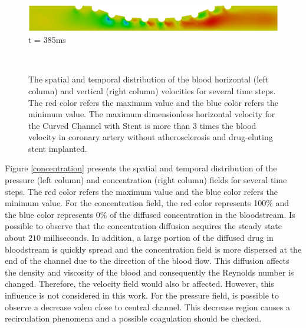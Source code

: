 \documentclass[10pt,fleqn,a4paper,twoside]{article}
\begin{document}
\begin{figure}[H]
\begin{minipage}{.45\linewidth}
      \includegraphics[scale=0.17]{./figure/verticalVelocity3.png}\\
      t = 385ms
     \end{minipage}\\[0.3cm]
     \caption{
The spatial and temporal distribution 
of the blood horizontal (left
column) and vertical (right column) velocities for
several time steps. 
The red color refers the maximum value and 
the blue color refers the minimum value.
The maximum dimensionless horizontal
velocity for the Curved Channel with Stent is 
more than 3 times the blood velocity in coronary 
artery without atherosclerosis and
drug-eluting stent implanted.
}\label{velocity}
\end{figure}







\smallskip
Figure \ref{concentration} presents the spatial and 
temporal distribution of the pressure (left
column) and concentration (right column) fields for
several time steps. The red color refers the maximum value and 
the blue color refers the minimum value.
For the concentration field, 
the red color represents 100\% and 
the blue color represents 0\% of the diffused concentration
in the bloodstream. Is possible to observe that
the concentration diffusion acquires the steady state about
$210$ milliseconds. In addition, a large portion of
the diffused drug in bloodstream is quickly spread and
the concentration field is more dispersed at the end
of the channel due to the direction of the blood flow.
This diffusion affects the density and viscosity of
the blood and consequently the Reynolds number is changed. 
Therefore, the velocity field would also br affected. However,
this influence is not considered in this work.
For the pressure field, is possible to observe a
decrease valeu close to central channel. This
decrease region causes a recirculation phenomena
and a possible coagulation should be checked.
\end{document}
